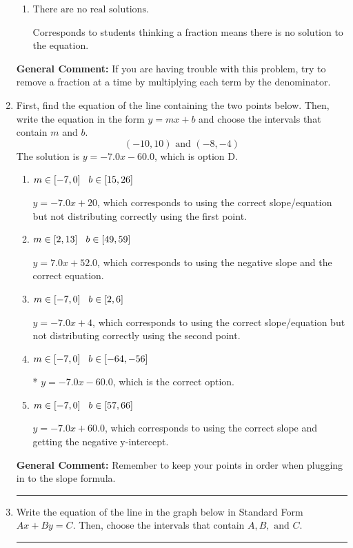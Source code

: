 \documentclass{extbook}[14pt]
\newcommand{\litem}[1]{\item #1

\rule{\textwidth}{0.4pt}}
\begin{document}
\begin{enumerate}
{\begin{enumerate}[label=\Alph*.]
* $x = 1.978$, which is the correct option.
\item \( \text{There are no real solutions.} \)

Corresponds to students thinking a fraction means there is no solution to the equation.
\end{enumerate}

\textbf{General Comment:} If you are having trouble with this problem, try to remove a fraction at a time by multiplying each term by the denominator.
}
\litem{
First, find the equation of the line containing the two points below. Then, write the equation in the form $ y=mx+b $ and choose the intervals that contain $m$ and $b$.
\[ (-10, 10) \text{ and } (-8, -4) \]The solution is \( y = -7.0x -60.0 \), which is option D.\begin{enumerate}[label=\Alph*.]
\item \( m \in [-7, 0] \hspace*{3mm} b \in [15, 26] \)

 $y = -7.0x + 20$, which corresponds to using the correct slope/equation but not distributing correctly using the first point.
\item \( m \in [2, 13] \hspace*{3mm} b \in [49, 59] \)

 $y = 7.0x + 52.0$, which corresponds to using the negative slope and the correct equation.
\item \( m \in [-7, 0] \hspace*{3mm} b \in [2, 6] \)

 $y = -7.0x + 4$, which corresponds to using the correct slope/equation but not distributing correctly using the second point.
\item \( m \in [-7, 0] \hspace*{3mm} b \in [-64, -56] \)

* $y = -7.0x -60.0$, which is the correct option.
\item \( m \in [-7, 0] \hspace*{3mm} b \in [57, 66] \)

 $y = -7.0x + 60.0$, which corresponds to using the correct slope and getting the negative y-intercept.
\end{enumerate}

\textbf{General Comment:} Remember to keep your points in order when plugging in to the slope formula.
}
\litem{
Write the equation of the line in the graph below in Standard Form $Ax+By=C$. Then, choose the intervals that contain $A, B, \text{ and } C$.

}
\end{enumerate}
\end{document}
